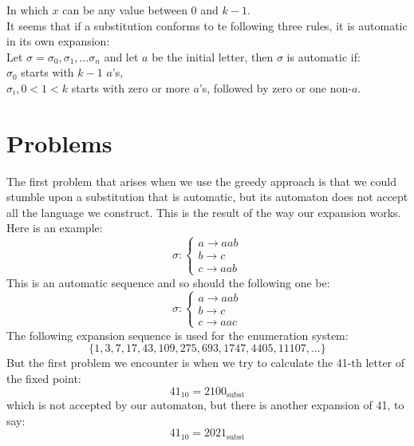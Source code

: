 \documentclass{article}
\begin{document}
In which $x$ can be any value between 0 and $k - 1$.\\
It seems that if a substitution conforms to te following three rules, it
is automatic in its own expansion:\\
Let $\sigma = \sigma_0, \sigma_1, ... \sigma_n$ and let $a$ be the initial 
letter, then $\sigma$ is automatic if:\\
$\sigma_0$ starts with $k - 1$ $a$'s,\\
$\sigma_i, 0 < 1 < k$ starts with zero or more $a$'s, followed by zero or one 
non-$a$.\\

\section{Problems}
The first problem that arises when we use the greedy approach is that we
could stumble upon a substitution that is automatic, but its automaton does
not accept all the language we construct. This is the result of the way our
expansion works. Here is an example:
\begin{displaymath}
\sigma: \left\{ \begin{array}{l}
a \rightarrow aab\\
b \rightarrow c\\
c \rightarrow aab
\end{array} \right.
\end{displaymath}
This is an automatic sequence and so should the following one be:
\begin{displaymath}
\sigma: \left\{ \begin{array}{l}
a \rightarrow aab\\
b \rightarrow c\\
c \rightarrow aac
\end{array} \right.
\end{displaymath}
The following expansion sequence is used for the enumeration system:
\begin{displaymath}
\{1, 3, 7, 17, 43, 109, 275, 693, 1747, 4405, 11107, ... \}
\end{displaymath}
But the first problem we encounter is when we try to calculate the 41-th
letter of the fixed point:
\begin{displaymath}
41_{10} = 2100_{\mathrm{subst}}
\end{displaymath}
which is not accepted by our automaton, but there is another expansion of
41, to say:
\begin{displaymath}
41_{10} = 2021_{\mathrm{subst}}
\end{displaymath}
\end{document}

